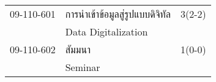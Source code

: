 \begin{longtable}{p{}p{}r{}}
09-110-601 & การนำเข้าข้อมูลสู่รูปแบบดิจิทัล & 3(2-2)\\
& Data Digitalization & \\[3mm]
09-110-602 & สัมมนา & 1(0-0)\\
& Seminar & \\[3mm]
\end{longtable}
